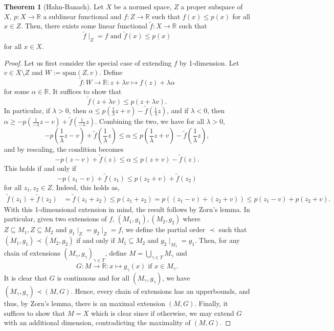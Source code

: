 \documentclass[]{article}
\theoremstyle{definition}
\newtheorem{theorem}{Theorem}
\theoremstyle{definition}
\begin{document}
\begin{theorem}[Hahn-Banach]
  Let \(X\) be a normed space, \(Z\) a proper subspace of \(X\), 
  \(p : X \to \mathbb{R}\) a sublinear functional and \(f : Z \to \mathbb{R}\) 
  such that \(f(x) \le p(x)\) for all \(x \in Z\). Then, there exists some 
  linear functional \(\tilde f : X \to \mathbb{R}\) such that 
  \[\tilde f\mid_Z = f \text{ and } \tilde f(x) \le p(x)\]
  for all \(x \in X\).
\end{theorem}
\begin{proof}
  Let us first consider the special case of extending \(f\) by 1-dimension.
  Let \(v \in X \setminus Z\) and \(W := \text{span}(Z, v)\). Define 
  \[\tilde f : W \to \mathbb{R} : z + \lambda v \mapsto f(z) + \lambda \alpha\]
  for some \(\alpha \in \mathbb{R}\). It suffices to show that 
  \[\tilde f(z + \lambda v) \le p(z + \lambda v).\]
  In particular, if \(\lambda > 0\), then 
  \(\alpha \le p\left(\frac{1}{\lambda} z + v\right) - 
    \tilde f\left(\frac{1}{\lambda}z\right)\),
  and if \(\lambda < 0\), then 
  \(\alpha \ge -p\left(\frac{1}{-\lambda}z - v\right) + 
    \tilde f\left(\frac{1}{-\lambda}z\right)\). Combining the two, we have 
  for all \(\lambda > 0\), 
  \[-p\left(\frac{1}{\lambda}z - v\right) + 
  \tilde f\left(\frac{1}{\lambda}z\right)
    \le \alpha \le p\left(\frac{1}{\lambda} z + v\right) - 
  \tilde f\left(\frac{1}{\lambda}z\right),\]
  and by rescaling, the condition becomes 
  \[-p\left(z - v\right) + \tilde f\left(z\right)
    \le \alpha \le p\left( z + v\right) - \tilde f\left(z\right).\]
  This holds if and only if 
  \[-p(z_1 - v) + \tilde f(z_1) \le p(z_2 + v) + \tilde f(z_2)\]
  for all \(z_1, z_2 \in Z\). Indeed, this holds as,
  \[\begin{split}
    \tilde f(z_1) + \tilde f(z_2) & = \tilde f(z_1 + z_2) 
      \le p(z_1 + z_2) = p((z_1 - v) + (z_2 + v)) \le p(z_1 - v) + p(z_2 + v).
  \end{split}\]
  With this 1-dimensional extension in mind, the result follows by Zorn's lemma.
  In particular, given two extensions of \(f\), \((M_1, g_1), (M_2, g_2)\) 
  where \(Z \subseteq M_1, Z \subseteq M_2\) and \(g_1\mid_Z = g_2\mid_Z = f\), 
  we define the partial order \(\prec\) such that \((M_1, g_1)\prec (M_2, g_2)\) 
  if and only if \(M_1 \subseteq M_2\) and \(g_2\mid_{M_1} = g_1\). Then, 
  for any chain of extensions \((M_\gamma, g_\gamma)_{\gamma \in T}\), define 
  \(M = \bigcup_{\gamma \in T} M_\gamma\) and 
  \[G : M \to \mathbb{R} : x \mapsto g_\gamma(x) \text{ if } x \in M_\gamma.\]
  It is clear that \(G\) is continuous and for all \((M_\gamma, g_\gamma)\), 
  we have \((M_\gamma, g_\gamma) \prec (M, G)\). Hence, every chain of extensions 
  has an upperbounds, and thus, by Zorn's lemma, there is an maximal extension 
  \((M, G)\). Finally, it suffices to show that \(M = X\) which is clear since 
  if otherwise, we may extend \(G\) with an additional dimension, contradicting 
  the maximality of \((M, G)\).
\end{proof}
\end{document}
